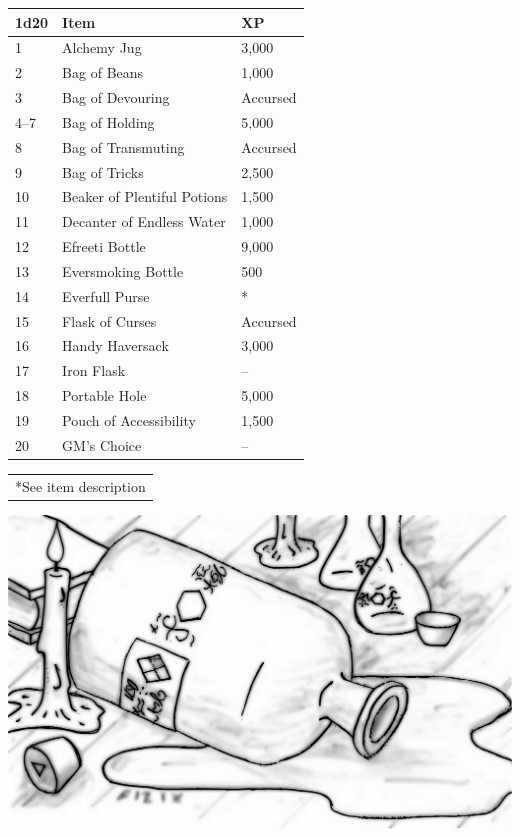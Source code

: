 \begin{multicols}{2}
\begin{minipage}{\columnwidth}
\label{bagsbottles}
\noindent \begin{tabular}{|p{}|p{}|p{}|}
\hline
1d20	& Item	& XP \\
\hline\hline
\rowcolor[gray]{0.9}1	& Alchemy Jug	& 3,000 \\
2	& Bag of Beans	& 1,000 \\
\rowcolor[gray]{0.9}3	& Bag of Devouring	& Accursed \\
4--7	& Bag of Holding	& 5,000 \\
\rowcolor[gray]{0.9}8	& Bag of Transmuting	& Accursed \\
9	& Bag of Tricks	& 2,500 \\
\rowcolor[gray]{0.9}10	& Beaker of Plentiful Potions	& 1,500 \\
11	& Decanter of Endless Water	& 1,000 \\
\rowcolor[gray]{0.9}12	& Efreeti Bottle	& 9,000 \\
13	& Eversmoking Bottle	& 500 \\
\rowcolor[gray]{0.9}14	& Everfull Purse	& * \\
15	& Flask of Curses	& Accursed \\
\rowcolor[gray]{0.9}16	& Handy Haversack	& 3,000 \\
17	& Iron Flask	& -- \\
\rowcolor[gray]{0.9}18	& Portable Hole	& 5,000 \\
19	& Pouch of Accessibility	& 1,500 \\
\rowcolor[gray]{0.9}20	& GM's Choice	& -- \\
\hline
\end{tabular}
\noindent\begin{tabular}{p{}}
*See item description \\
\end{tabular}\vspace{.5em}

\end{minipage}

\vspace{.5em}

\noindent\includegraphics[width=\columnwidth]{alchemy.pdf}\label{alchemy}


\end{multicols}
